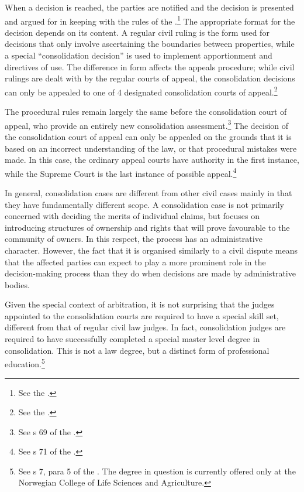 When a decision is reached, the parties are notified and the decision is presented and argued for in keeping with the rules of the \cite{cda05}.\footnote{See the 
\cite[7|22]{lca79}.} The appropriate format for the decision depends on its content. A regular civil ruling is the form used for decisions that only involve ascertaining the boundaries between properties, while a special ``consolidation decision'' is used to implement apportionment and directives of use. The difference in form affects the appeals procedure; while civil rulings are dealt with by the regular courts of appeal, the consolidation decisions can only be appealed to one of 4 designated consolidation courts of appeal.\footnote{See  the \cite[61]{lca79}.}

The procedural rules remain largely the same before the consolidation court of appeal, who provide an entirely new consolidation assessment.\footnote{See s 69 of the \cite{lca79}.} The decision of the consolidation court of appeal can only be appealed on the grounds that it is based on an incorrect understanding of the law, or that procedural mistakes were made. In this case, the ordinary appeal courts have authority in the first instance, while the Supreme Court is the last instance of possible appeal.\footnote{See s 71 of the \cite{lca79}.}

In general, consolidation cases are different from other civil cases mainly in that they have fundamentally different scope. A consolidation case is not primarily concerned with deciding the merits of individual claims, but focuses on introducing structures of ownership and rights that will prove favourable to the community of owners. In this respect, the process has an administrative character. However, the fact that it is organised similarly to a civil dispute means that the affected parties can expect to play a more prominent role in the decision-making process than they do when decisions are made by administrative bodies.

Given the special context of arbitration, it is not surprising that the judges appointed to the consolidation courts are required to have a special skill set, different from that of regular civil law judges. In fact, consolidation judges are required to have successfully completed a special master level degree in consolidation. This is not a law degree, but a distinct form of professional education.\footnote{See s 7, para 5 of the \cite{lca79}. The degree in question is currently offered only at the Norwegian College of Life Sciences and Agriculture.} 


